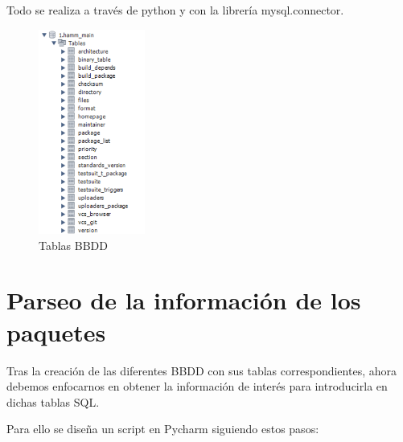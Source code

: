 \documentclass[a4paper, 12pt]{book}
\begin{document}
\begin{itemize}
	Todo se realiza a través de python y con la librería mysql.connector.
	
	\begin{figure}[h]
		\centering
		\includegraphics[width=3.5cm, keepaspectratio]{img/Tablas.png}
		\caption{Tablas BBDD}
		\label{fig:Tablas}
	\end{figure}

	
\end{itemize}

\section{Parseo de la información de los paquetes} 
\label{sec:parseo}
Tras la creación de las diferentes BBDD con sus tablas correspondientes, ahora debemos enfocarnos en obtener la información de interés para introducirla en dichas tablas SQL.

Para ello se diseña un script en Pycharm siguiendo estos pasos:
\end{document}

